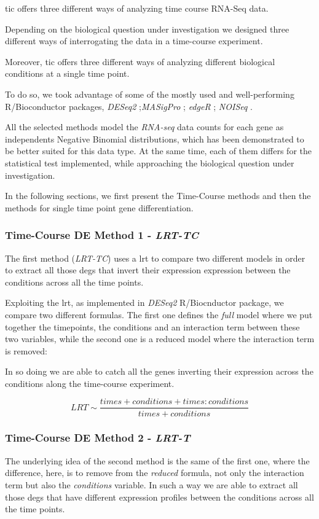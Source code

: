 \gls{tic} offers three different ways of analyzing time course RNA-Seq data.

Depending on the biological question under investigation we designed three different ways of interrogating the data in a time-course experiment.

Moreover, \gls{tic} offers three different ways of analyzing different biological conditions at a single time point.

To do so, we took advantage of some of the mostly used and well-performing \cite{Costa-Silva2017} R/Bioconductor packages, \textit{DESeq2} \cite{Love2014};\textit{MASigPro} \cite{Nueda2014}; \textit{edgeR} \cite{Robinson2009}; \textit{NOISeq} \cite{Tarazona2012}.

All the selected methods model the \textit{RNA-seq} data counts for each gene as independents Negative Binomial distributions, which has been demonstrated \cite{Robinson2007} to be better suited for this data type.
At the same time, each of them differs for the statistical test implemented, while approaching the biological question under investigation.

In the following sections, we first present the Time-Course methods and then the methods for single time point gene differentiation.

\subsubsection{Time-Course DE Method 1 - \textit{LRT-TC}}
The first method (\textit{LRT-TC}) uses a \gls{lrt} to compare two different models in order to extract all those \glspl{deg} that invert their expression expression between the conditions across all the time points.

Exploiting the \gls{lrt}, as implemented in \textit{DESeq2} R/Biocnductor package, we compare two different formulas.
The first one defines the \textit{full} model where we put together the timepoints, the conditions and an interaction term between these two variables, while the second one is a reduced model where the interaction term is removed:

In so doing we are able to catch all the genes inverting their expression across the conditions along the time-course experiment. 

\[LRT \sim \frac{times+conditions+times:conditions}{times+conditions}\]


\subsubsection{Time-Course DE Method 2 - \textit{LRT-T}}
The underlying idea of the second method is the same of the first one, where the difference, here, is to remove from the \textit{reduced} formula, not only the interaction term but also the \textit{conditions} variable.
In such a way we are able to extract all those \glspl{deg} that have different expression profiles between the conditions across all the time points.

